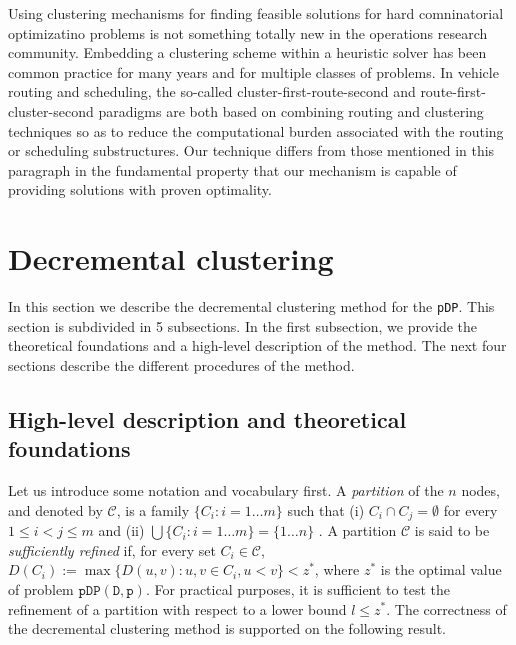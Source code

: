 \documentclass[a4paper,10pt]{article}
\newcommand{\pDP}{\texttt{pDP}}
\newcommand{\pdp}[2]{$\mathtt{pDP({#1}, {#2})}$}
\newcommand{\mC}{\mathcal{C}}
\begin{document}
Using clustering mechanisms for finding feasible solutions for hard comninatorial optimizatino problems is not something totally new in the operations research community. Embedding a clustering scheme within a heuristic solver has been common practice for many years and for multiple classes of problems. In vehicle routing and scheduling, the so-called cluster-first-route-second \citep{Solomon1987algorithms, Braysy2005Vehicle} and route-first-cluster-second \citep{Beasley1983route, Prins2014Order} paradigms are both based on combining routing and clustering techniques so as to reduce the computational burden associated with the routing or scheduling substructures. Our technique differs from those mentioned in this paragraph in the fundamental property that our mechanism is capable of providing solutions with proven optimality.

\section{Decremental clustering\label{section:decrclust}}

In this section we describe the decremental clustering method for the \pDP{}. This section is subdivided in 5 subsections. In the first subsection, we provide the theoretical foundations and a high-level description of the method. The next four sections describe the different procedures of the method.

\subsection{High-level description and theoretical foundations}

Let us introduce some notation and vocabulary first. A \textit{partition} of the $n$ nodes, and denoted by $\mC$, is a family $\{C_i: i = 1 \ldots m\}$ such that (i) $C_i\cap C_j =\emptyset$ for every $1\leq i < j\leq m$ and (ii) $\bigcup\{C_i: i=1\ldots m\} = \{1\ldots n\}$ . A partition $\mC$ is said to be \textit{sufficiently refined} if, for every set $C_i\in\mathcal{C}$, $D(C_i) := \max\{D(u, v): u, v\in C_i, u < v\} < z^*$, where $z^*$ is the optimal value of problem \pdp{D}{p}. For practical purposes, it is sufficient to test the refinement of a partition with respect to a lower bound $l \leq z^*$. The correctness of the decremental clustering method is supported on the following result.
\end{document}
